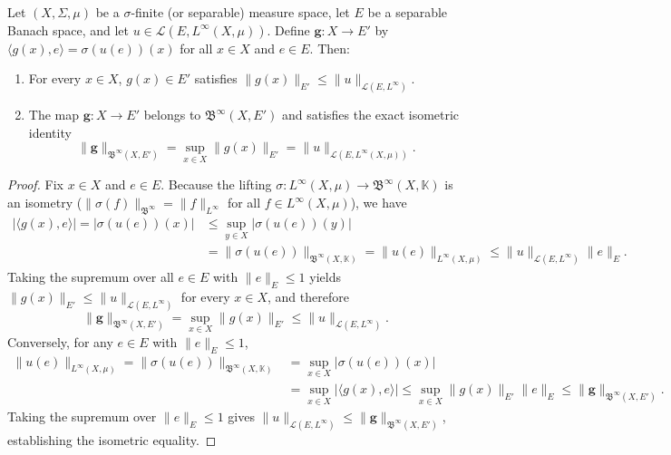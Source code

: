 \begin{theorem}
\label{thm:section_5_completed}
Let $(X, \Sigma, \mu)$ be a $\sigma$-finite (or separable) measure space, let $E$ be a separable Banach space, and let $u \in \mathcal{L}(E, L^\infty(X, \mu))$. Define $\mathbf{g} : X \to E'$ by $\langle g(x), e \rangle = \sigma(u(e))(x)$ for all $x \in X$ and $e \in E$. Then:
\begin{enumerate}
  \item For every $x \in X$, $g(x) \in E'$ satisfies $\|g(x)\|_{E'} \le \|u\|_{\mathcal{L}(E, L^\infty)}$.
  \item The map $\mathbf{g} : X \to E'$ belongs to $\mathfrak{B}^\infty(X, E')$ and satisfies the exact isometric identity
  \[
    \|\mathbf{g}\|_{\mathfrak{B}^\infty(X, E')}
    = \sup_{x \in X} \|g(x)\|_{E'}
    = \|u\|_{\mathcal{L}(E, L^\infty(X, \mu))}.
  \]
\end{enumerate}
\end{theorem}
\begin{proof}
Fix $x \in X$ and $e \in E$. Because the lifting $\sigma : L^\infty(X, \mu) \to \mathfrak{B}^\infty(X, \mathbb{K})$ is an isometry ($\|\sigma(f)\|_{\mathfrak{B}^\infty} = \|f\|_{L^\infty}$ for all $f \in L^\infty(X, \mu)$), we have
\[
\begin{aligned}
  |\langle g(x), e \rangle|
  = |\sigma(u(e))(x)|
  &\le \sup_{y \in X} |\sigma(u(e))(y)| \\
  &= \|\sigma(u(e))\|_{\mathfrak{B}^\infty(X, \mathbb{K})}
  = \|u(e)\|_{L^\infty(X, \mu)}
  \le \|u\|_{\mathcal{L}(E, L^\infty)} \|e\|_E.
\end{aligned}
\]
Taking the supremum over all $e \in E$ with $\|e\|_E \le 1$ yields $\|g(x)\|_{E'} \le \|u\|_{\mathcal{L}(E, L^\infty)}$ for every $x \in X$, and therefore
\[
  \|\mathbf{g}\|_{\mathfrak{B}^\infty(X, E')} = \sup_{x \in X} \|g(x)\|_{E'} \le \|u\|_{\mathcal{L}(E, L^\infty)}.
\]
Conversely, for any $e \in E$ with $\|e\|_E \le 1$,
\[
\begin{aligned}
  \|u(e)\|_{L^\infty(X, \mu)}
  = \|\sigma(u(e))\|_{\mathfrak{B}^\infty(X, \mathbb{K})}
  &= \sup_{x \in X} |\sigma(u(e))(x)| \\
  &= \sup_{x \in X} |\langle g(x), e \rangle|
  \le \sup_{x \in X} \|g(x)\|_{E'} \|e\|_E
  \le \|\mathbf{g}\|_{\mathfrak{B}^\infty(X, E')}.
\end{aligned}
\]
Taking the supremum over $\|e\|_E \le 1$ gives $\|u\|_{\mathcal{L}(E, L^\infty)} \le \|\mathbf{g}\|_{\mathfrak{B}^\infty(X, E')}$, establishing the isometric equality.
\end{proof}

